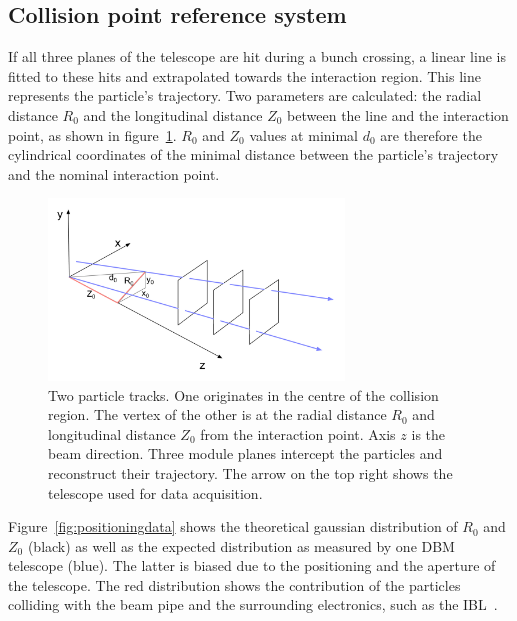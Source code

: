 \subsection{Collision point reference system}
If all three planes of the telescope are hit during a bunch crossing, a linear line is fitted to these hits and extrapolated towards the interaction region. This line represents the particle's trajectory. Two parameters are calculated: the radial distance $R_\mathrm{0}$ and the longitudinal distance $Z_\mathrm{0}$ between the line and the interaction point, as shown in figure~\ref{fig:z-r-distance}. $R_\mathrm{0}$ and $Z_\mathrm{0}$ values at minimal $d_\mathrm{0}$ are therefore the cylindrical coordinates of the minimal distance between the particle's trajectory and the nominal interaction point.
\begin{figure}[!t]
\centering
\includegraphics[width=0.7\textwidth]{../scripts/04_charge_monitoring/plots/z-r-distance2}
\caption{Two particle tracks. One originates in the centre of the collision region. The vertex of the other is at the radial distance $R_\mathrm{0}$ and longitudinal distance $Z_\mathrm{0}$ from the interaction point. Axis $z$ is the beam direction. Three module planes intercept the particles and reconstruct their trajectory. The arrow on the top right shows the telescope used for data acquisition.}
\label{fig:z-r-distance}
\end{figure}
Figure~\ref{fig:positioningdata} shows the theoretical gaussian distribution of $R_\mathrm{0}$ and $Z_\mathrm{0}$ (black) as well as the expected distribution as measured by one DBM telescope (blue). The latter is biased due to the positioning and the aperture of the telescope. The red distribution shows the contribution of the particles colliding with the beam pipe and the surrounding electronics, such as the IBL~\cite{Capeans:1291633}.



